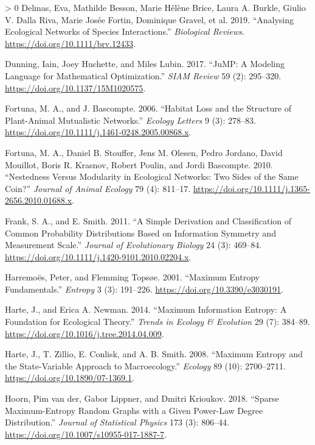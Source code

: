 \documentclass[11pt]{article}
\newlength{\cslhangindent}
\newenvironment{CSLReferences}[3] %
 {%
  \setlength{\parindent}{0pt}
  \ifodd #1 \everypar{\setlength{\hangindent}{\cslhangindent}}\ignorespaces\fi
  \ifnum #2 > 0
  \setlength{\parskip}{#2\baselineskip}
  \fi
 }%
 {}
\begin{document}
\begin{CSLReferences}{1}{0}
\leavevmode\hypertarget{ref-Delmas2019AnaEco}{}%
Delmas, Eva, Mathilde Besson, Marie Hélène Brice, Laura A. Burkle,
Giulio V. Dalla Riva, Marie Josée Fortin, Dominique Gravel, et al. 2019.
{``Analysing Ecological Networks of Species Interactions.''}
\emph{Biological Reviews}. \url{https://doi.org/10.1111/brv.12433}.

\leavevmode\hypertarget{ref-Dunning2017JumMod}{}%
Dunning, Iain, Joey Huchette, and Miles Lubin. 2017. {``JuMP: A Modeling
Language for Mathematical Optimization.''} \emph{SIAM Review} 59 (2):
295--320. \url{https://doi.org/10.1137/15M1020575}.

\leavevmode\hypertarget{ref-Fortuna2006HabLos}{}%
Fortuna, M. A., and J. Bascompte. 2006. {``Habitat Loss and the
Structure of Plant-Animal Mutualistic Networks.''} \emph{Ecology
Letters} 9 (3): 278--83.
\url{https://doi.org/10.1111/j.1461-0248.2005.00868.x}.

\leavevmode\hypertarget{ref-Fortuna2010NesMod}{}%
Fortuna, M. A., Daniel B. Stouffer, Jens M. Olesen, Pedro Jordano, David
Mouillot, Boris R. Krasnov, Robert Poulin, and Jordi Bascompte. 2010.
{``Nestedness Versus Modularity in Ecological Networks: Two Sides of the
Same Coin?''} \emph{Journal of Animal Ecology} 79 (4): 811--17.
\url{https://doi.org/10.1111/j.1365-2656.2010.01688.x}.

\leavevmode\hypertarget{ref-Frank2011SimDera}{}%
Frank, S. A., and E. Smith. 2011. {``A Simple Derivation and
Classification of Common Probability Distributions Based on Information
Symmetry and Measurement Scale.''} \emph{Journal of Evolutionary
Biology} 24 (3): 469--84.
\url{https://doi.org/10.1111/j.1420-9101.2010.02204.x}.

\leavevmode\hypertarget{ref-Harremoes2001MaxEnt}{}%
Harremoës, Peter, and Flemming Topsøe. 2001. {``Maximum Entropy
Fundamentals.''} \emph{Entropy} 3 (3): 191--226.
\url{https://doi.org/10.3390/e3030191}.

\leavevmode\hypertarget{ref-Harte2014MaxInf}{}%
Harte, J., and Erica A. Newman. 2014. {``Maximum Information Entropy: A
Foundation for Ecological Theory.''} \emph{Trends in Ecology \&
Evolution} 29 (7): 384--89.
\url{https://doi.org/10.1016/j.tree.2014.04.009}.

\leavevmode\hypertarget{ref-Harte2008MaxEnt}{}%
Harte, J., T. Zillio, E. Conlisk, and A. B. Smith. 2008. {``Maximum
Entropy and the State-Variable Approach to Macroecology.''}
\emph{Ecology} 89 (10): 2700--2711.
\url{https://doi.org/10.1890/07-1369.1}.

\leavevmode\hypertarget{ref-vanderHoorn2018SpaMaxa}{}%
Hoorn, Pim van der, Gabor Lippner, and Dmitri Krioukov. 2018. {``Sparse
Maximum-Entropy Random Graphs with a Given Power-Law Degree
Distribution.''} \emph{Journal of Statistical Physics} 173 (3): 806--44.
\url{https://doi.org/10.1007/s10955-017-1887-7}.


\end{CSLReferences}
\end{document}
